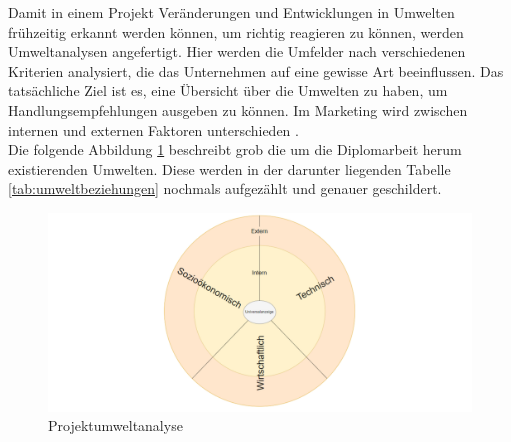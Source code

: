 Damit in einem Projekt Veränderungen und Entwicklungen in Umwelten frühzeitig erkannt werden können, um richtig reagieren zu können, werden Umweltanalysen angefertigt. Hier werden die Umfelder nach verschiedenen Kriterien analysiert, die das Unternehmen auf eine gewisse Art beeinflussen. Das tatsächliche Ziel ist es, eine Übersicht über die Umwelten zu haben, um Handlungsempfehlungen ausgeben zu können. Im Marketing wird zwischen internen und externen Faktoren unterschieden \cite[vgl.][]{Wikipedia:2023, Redaktion:2024}. \\
Die folgende Abbildung \ref{fig:umweltanalyse} beschreibt grob die um die Diplomarbeit herum existierenden Umwelten. Diese werden in der darunter liegenden Tabelle \ref{tab:umweltbeziehungen} nochmals aufgezählt und genauer geschildert.

\begin{figure}[H]
	\centering
	\includegraphics[width=15cm]{Bilder/Umweltanalyse}
	\caption{Projektumweltanalyse}
	\label{fig:umweltanalyse}
\end{figure}

